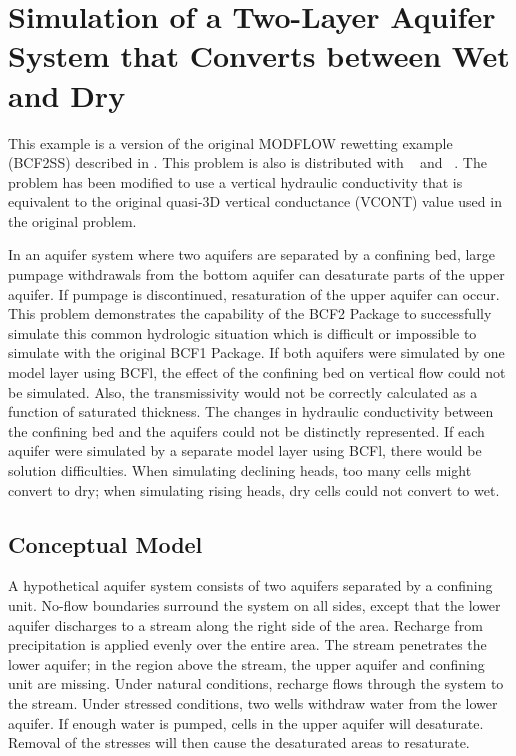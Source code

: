 \section{Simulation of a Two-Layer Aquifer System that Converts between Wet and Dry}

This example is a version of the original MODFLOW rewetting example (BCF2SS) described in \cite{mcdonaldetal1991wetdry}. This problem is also is distributed with \mff~\citep{modflow2005} and \mf~\citep{modflow6software}. The problem has been modified to use a vertical hydraulic conductivity that is equivalent to the original quasi-3D vertical conductance (VCONT) value used in the original problem.

In an aquifer system where two aquifers are separated by a confining bed, large pumpage withdrawals from the bottom aquifer can desaturate parts of the upper aquifer. If pumpage is discontinued, resaturation of the upper aquifer can occur. This problem demonstrates the capability of the BCF2 Package to successfully simulate this common hydrologic situation which is difficult or impossible to simulate with the original BCF1 Package. If both aquifers were simulated by one model layer using BCFl, the effect of the confining bed on vertical flow could not be simulated. Also, the transmissivity would not be correctly calculated as a function of saturated thickness. The changes in hydraulic conductivity between the confining bed and the aquifers could not be distinctly represented. If each aquifer were simulated by a separate model layer using BCFl, there would be solution difficulties. When simulating declining heads, too many cells might convert to dry; when simulating rising heads, dry cells could not convert to wet.

\subsection{Conceptual Model}

A hypothetical aquifer system consists of two aquifers separated by a confining unit. No-flow boundaries surround the system on all sides, except that the lower aquifer discharges to a stream along the right side of the area. Recharge from precipitation is applied evenly over the entire area. The stream penetrates the lower aquifer; in the region above the stream, the upper aquifer and confining unit are missing. Under natural conditions, recharge flows through the system to the stream. Under stressed conditions, two wells withdraw water from the lower aquifer. If enough water is pumped, cells in the upper aquifer will desaturate. Removal of the stresses will then cause the desaturated areas to resaturate.



